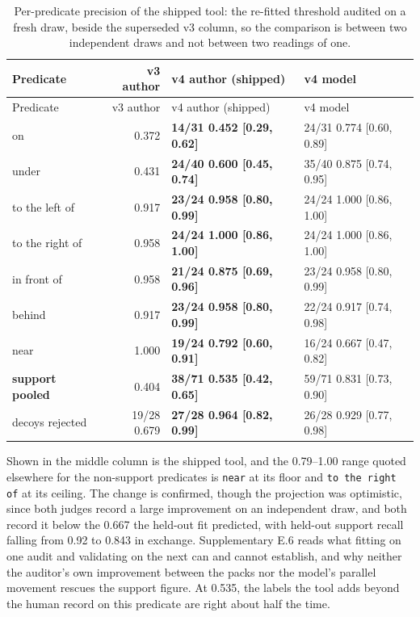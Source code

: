 \begin{center}
\setlength{\tabcolsep}{3pt}
\footnotesize
\begin{longtable}{lrll}
\caption[Per-predicate precision of the shipped tool]{Per-predicate precision of the shipped tool: the re-fitted threshold audited on a fresh draw, beside the superseded v3 column, so the comparison is between two independent draws and not between two readings of one.}\\
\hline
Predicate & v3 author & v4 author (shipped) & v4 model \\
\hline
\endfirsthead
\hline
Predicate & v3 author & v4 author (shipped) & v4 model \\
\hline
\endhead
on & 0.372 & \textbf{14/31 0.452 [0.29, 0.62]} & 24/31 0.774 [0.60, 0.89] \\
under & 0.431 & \textbf{24/40 0.600 [0.45, 0.74]} & 35/40 0.875 [0.74, 0.95] \\
to the left of & 0.917 & \textbf{23/24 0.958 [0.80, 0.99]} & 24/24 1.000 [0.86, 1.00] \\
to the right of & 0.958 & \textbf{24/24 1.000 [0.86, 1.00]} & 24/24 1.000 [0.86, 1.00] \\
in front of & 0.958 & \textbf{21/24 0.875 [0.69, 0.96]} & 23/24 0.958 [0.80, 0.99] \\
behind & 0.917 & \textbf{23/24 0.958 [0.80, 0.99]} & 22/24 0.917 [0.74, 0.98] \\
near & 1.000 & \textbf{19/24 0.792 [0.60, 0.91]} & 16/24 0.667 [0.47, 0.82] \\
\textbf{support pooled} & 0.404 & \textbf{38/71 0.535 [0.42, 0.65]} & 59/71 0.831 [0.73, 0.90] \\
decoys rejected & 19/28 0.679 & \textbf{27/28 0.964 [0.82, 0.99]} & 26/28 0.929 [0.77, 0.98] \\
\hline
\end{longtable}
\end{center}

Shown in the middle column is the shipped tool, and the 0.79--1.00 range quoted elsewhere for the non-support predicates is \texttt{near} at its floor and \texttt{to the right of} at its ceiling. The change is confirmed, though the projection was optimistic, since both judges record a large improvement on an independent draw, and both record it below the 0.667 the held-out fit predicted, with held-out support recall falling from 0.92 to 0.843 in exchange. Supplementary E.6 reads what fitting on one audit and validating on the next can and cannot establish, and why neither the auditor's own improvement between the packs nor the model's parallel movement rescues the support figure. At 0.535, the labels the tool adds beyond the human record on this predicate are right about half the time.

